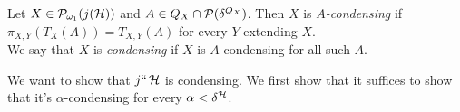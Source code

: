 \documentclass[../main]{subfiles}
\begin{document}
\begin{definition}
   Let $X\in\P_{\omega_1}(j(\h))$ and
  $A\in Q_X\cap\P(\delta^{Q_X})$. Then $X$ is \emph{$A$-condensing} if
  $\pi_{X,Y}(T_{X}(A))=T_{X,Y}(A)$ for every $Y$ extending $X$. \\
  We say that $X$ is \emph{condensing} if $X$ is $A$-condensing for
  all such $A$.
\end{definition}

We want to show that $j``\h$ is condensing. We first show that it suffices to show that it's $\alpha$-condensing for every $\alpha<\delta^{\h}$.


\end{document}
